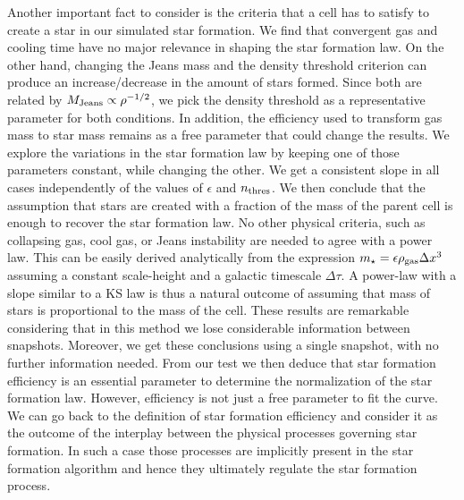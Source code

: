 \documentclass[twocolumn]{aastex}
\newcommand{\mstar}{m_\star}
\newcommand{\rhogas}{\rho_{\rm gas}}
\begin{document}
Another important fact to consider is the criteria that a cell has to satisfy to create a star in our simulated star formation. We find that convergent gas and cooling time have no major relevance in shaping the star formation law. On the other hand, changing the Jeans mass and the density threshold criterion can produce an increase/decrease in the amount of stars formed. Since both are related by $M_{\rm Jeans} \propto \rho^{-1/2}$, we pick the density threshold as a representative parameter for both conditions. In addition, the efficiency used to transform gas mass to star mass remains as a free parameter that could change the results. We explore the variations in the star formation law by keeping one of those parameters constant, while changing the other. We get a consistent slope in all cases independently of the values of $\epsilon$ and $n_{\rm thres}$. We then conclude that the assumption that stars are created with a fraction of the mass of the parent cell is enough to recover the star formation law. No other physical criteria, such as collapsing gas, cool gas, or Jeans instability are needed to agree with a power law. This can be easily derived analytically from the expression $\mstar=\epsilon\rhogas\Delta x^3$ assuming a constant scale-height and a galactic timescale $\Delta \tau$. A power-law with a slope similar to a KS law is thus a natural outcome of assuming that mass of stars is proportional to the mass of the cell. These results are remarkable considering that in this method we lose considerable information between snapshots. Moreover, we get these conclusions using a single snapshot, with no further information needed. From our test we then deduce that star formation efficiency is an essential parameter to determine the normalization of the star formation law. However, efficiency is not just a free parameter to fit the curve. We can go back to the definition of star formation efficiency and consider it as the outcome of the interplay between the physical processes governing star formation. In such a case those processes are implicitly present in the star formation algorithm and hence they ultimately regulate the star formation process.
\end{document}
